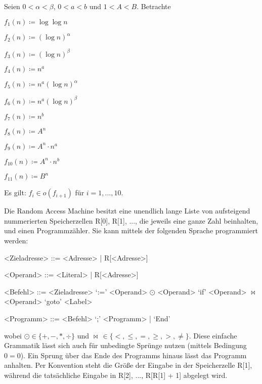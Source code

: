 \documentclass{cheat-sheet}
\begin{document}
\begin{satz}
  Seien $0 < \alpha < \beta$, $0 < a < b$ und $1 < A < B$. Betrachte
  \begin{itemize}
    \begin{multicols}{3}
      \item $f_1(n) \coloneqq \log \log n$
      \item $f_2(n) \coloneqq (\log n)^\alpha$
      \item $f_3(n) \coloneqq (\log n)^\beta$
      \item $f_4(n) \coloneqq n^a$
      \item $f_5(n) \coloneqq n^a (\log n)^\alpha$
      \item $f_6(n) \coloneqq n^a (\log n)^\beta$
      \item $f_7(n) \coloneqq n^b$
      \item $f_8(n) \coloneqq A^n$
      \item $f_9(n) \coloneqq A^n \cdot n^a$
      \item $f_{10}(n) \coloneqq A^n \cdot n^b$
      \item $f_{11}(n) \coloneqq B^n$
    \end{multicols}
  \end{itemize}
  Es gilt: $f_i \in o(f_{i+1})$ für $i = 1, ..., 10$.
\end{satz}


\begin{defn}[RAM]
  Die Random Access Machine besitzt eine unendlich lange Liste von aufsteigend nummerierten Speicherzellen R[0], R[1], ..., die jeweils eine ganze Zahl beinhalten, und einen Programmzähler. Sie kann mittels der folgenden Sprache programmiert werden:
  \begin{grammar}
    <Zieladresse> ::= <Adresse> | R[<Adresse>]

    <Operand> ::= <Literal> | R[<Adresse>]

    <Befehl> ::= <Zieladresse> `:=' <Operand> $\odot$ <Operand>
    \alt `if' <Operand> $\bowtie$ <Operand> `goto' <Label>

    <Programm> ::= <Befehl> `;' <Programm> | `End'
  \end{grammar}
  wobei $\odot \in \{ +, -, *, \div \}$ und $\bowtie \, \in \{ <, \leq, =, \geq, >, \not= \}$. Diese einfache Grammatik lässt sich auch für unbedingte Sprünge nutzen (mittels Bedingung $0 = 0$). Ein Sprung über das Ende des Programms hinaus lässt das Programm anhalten. Per Konvention steht die Größe der Eingabe in der Speicherzelle R[1], während die tatsächliche Eingabe in R[2], ..., R[R[1] + 1] abgelegt wird.
\end{defn}
\end{document}
